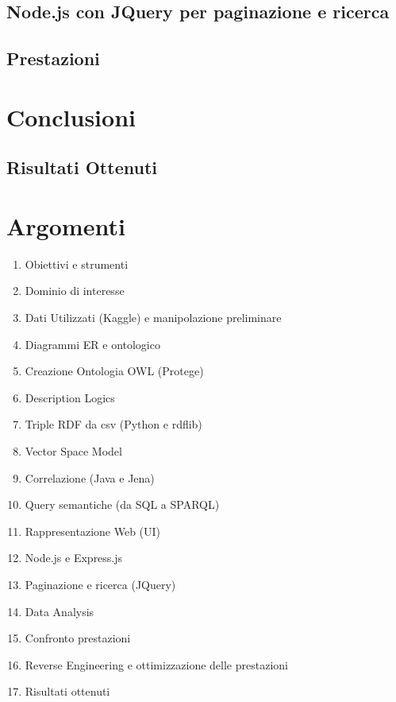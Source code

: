\documentclass[Lau,binding=0.6cm,noexaminfo]{sapthesis}
\begin{document}
\section{Node.js con JQuery per paginazione e ricerca}
\section{Prestazioni}

\chapter{Conclusioni}
\section{Risultati Ottenuti}


\chapter*{Argomenti}
\begin{enumerate}
  \item Obiettivi e strumenti
  \item Dominio di interesse
  \item Dati Utilizzati (Kaggle) e manipolazione preliminare
  \item Diagrammi ER e ontologico
  \item Creazione Ontologia OWL (Protege)
  \item Description Logics
  \item Triple RDF da csv (Python e rdflib)
  \item Vector Space Model
  \item Correlazione (Java e Jena)
  \item Query semantiche (da SQL a SPARQL)
  \item Rappresentazione Web (UI)
  \item Node.js e Express.js
  \item Paginazione e ricerca (JQuery)
  \item Data Analysis
  \item Confronto prestazioni
  \item Reverse Engineering e ottimizzazione delle prestazioni
  \item Risultati ottenuti
\end{enumerate}

\backmatter
\cleardoublepage
\end{document}
